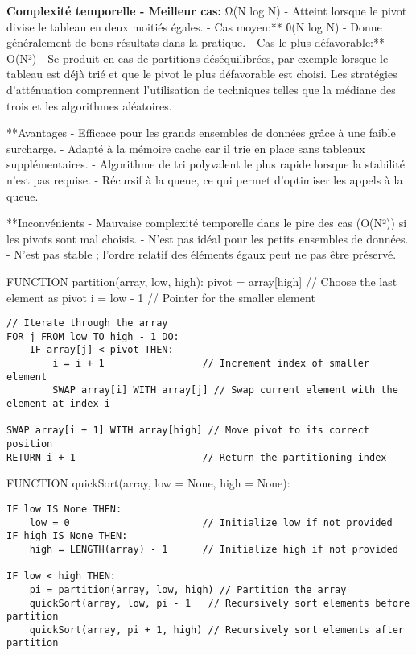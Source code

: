 \documentclass[11pt]{article}
\begin{document}
\textbf{Complexité temporelle - Meilleur cas:} Ω(N log N) - Atteint
lorsque le pivot divise le tableau en deux moitiés égales. - Cas
moyen:** θ(N log N) - Donne généralement de bons résultats dans la
pratique. - Cas le plus défavorable:** O(N²) - Se produit en cas de
partitions déséquilibrées, par exemple lorsque le tableau est déjà trié
et que le pivot le plus défavorable est choisi. Les stratégies
d'atténuation comprennent l'utilisation de techniques telles que la
médiane des trois et les algorithmes aléatoires.

**Avantages - Efficace pour les grands ensembles de données grâce à une
faible surcharge. - Adapté à la mémoire cache car il trie en place sans
tableaux supplémentaires. - Algorithme de tri polyvalent le plus rapide
lorsque la stabilité n'est pas requise. - Récursif à la queue, ce qui
permet d'optimiser les appels à la queue.

**Inconvénients - Mauvaise complexité temporelle dans le pire des cas
(O(N²)) si les pivots sont mal choisis. - N'est pas idéal pour les
petits ensembles de données. - N'est pas stable ; l'ordre relatif des
éléments égaux peut ne pas être préservé.

    FUNCTION partition(array, low, high): pivot = array{[}high{]} // Choose
the last element as pivot i = low - 1 // Pointer for the smaller element

\begin{verbatim}
// Iterate through the array
FOR j FROM low TO high - 1 DO:
    IF array[j] < pivot THEN:
        i = i + 1                 // Increment index of smaller element
        SWAP array[i] WITH array[j] // Swap current element with the element at index i

SWAP array[i + 1] WITH array[high] // Move pivot to its correct position
RETURN i + 1                      // Return the partitioning index
\end{verbatim}

FUNCTION quickSort(array, low = None, high = None):

\begin{verbatim}
IF low IS None THEN:
    low = 0                       // Initialize low if not provided
IF high IS None THEN:
    high = LENGTH(array) - 1      // Initialize high if not provided

IF low < high THEN:
    pi = partition(array, low, high) // Partition the array
    quickSort(array, low, pi - 1   // Recursively sort elements before partition
    quickSort(array, pi + 1, high) // Recursively sort elements after partition
\end{verbatim}
\end{document}
